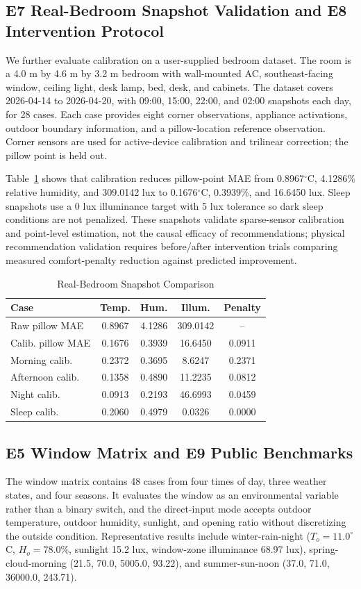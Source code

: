 \documentclass[conference]{IEEEtran}
\begin{document}
\subsection{E7 Real-Bedroom Snapshot Validation and E8 Intervention Protocol}
We further evaluate calibration on a user-supplied bedroom dataset. The room is a 4.0 m by 4.6 m by 3.2 m bedroom with wall-mounted AC, southeast-facing window, ceiling light, desk lamp, bed, desk, and cabinets. The dataset covers 2026-04-14 to 2026-04-20, with 09:00, 15:00, 22:00, and 02:00 snapshots each day, for 28 cases. Each case provides eight corner observations, appliance activations, outdoor boundary information, and a pillow-location reference observation. Corner sensors are used for active-device calibration and trilinear correction; the pillow point is held out.

Table~\ref{tab:real} shows that calibration reduces pillow-point MAE from 0.8967$^\circ$C, 4.1286\% relative humidity, and 309.0142 lux to 0.1676$^\circ$C, 0.3939\%, and 16.6450 lux. Sleep snapshots use a 0 lux illuminance target with 5 lux tolerance so dark sleep conditions are not penalized. These snapshots validate sparse-sensor calibration and point-level estimation, not the causal efficacy of recommendations; physical recommendation validation requires before/after intervention trials comparing measured comfort-penalty reduction against predicted improvement.

\begin{table}[t]
\caption{Real-Bedroom Snapshot Comparison}
\label{tab:real}
\centering
\scriptsize
\begin{tabular}{|l|c|c|c|c|}
\hline
Case & Temp. & Hum. & Illum. & Penalty\\
\hline
Raw pillow MAE & 0.8967 & 4.1286 & 309.0142 & --\\
Calib. pillow MAE & 0.1676 & 0.3939 & 16.6450 & 0.0911\\
Morning calib. & 0.2372 & 0.3695 & 8.6247 & 0.2371\\
Afternoon calib. & 0.1358 & 0.4890 & 11.2235 & 0.0812\\
Night calib. & 0.0913 & 0.2193 & 46.6993 & 0.0459\\
Sleep calib. & 0.2060 & 0.4979 & 0.0326 & 0.0000\\
\hline
\end{tabular}
\end{table}

\subsection{E5 Window Matrix and E9 Public Benchmarks}
The window matrix contains 48 cases from four times of day, three weather states, and four seasons. It evaluates the window as an environmental variable rather than a binary switch, and the direct-input mode accepts outdoor temperature, outdoor humidity, sunlight, and opening ratio without discretizing the outside condition. Representative results include winter-rain-night ($T_o=11.0^\circ$C, $H_o=78.0\%$, sunlight 15.2 lux, window-zone illuminance 68.97 lux), spring-cloud-morning (21.5, 70.0, 5005.0, 93.22), and summer-sun-noon (37.0, 71.0, 36000.0, 243.71).
\end{document}
